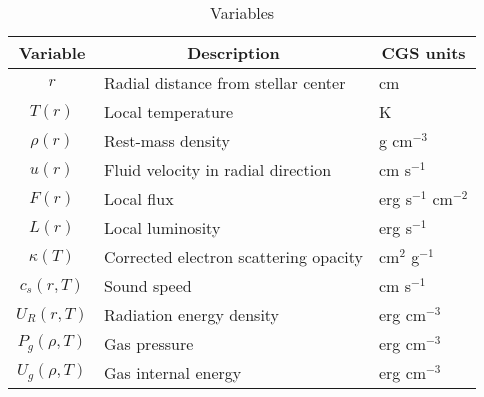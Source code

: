 \documentclass[../main.tex]{subfiles}
\begin{document}
\begin{table}[htb!]
    \centering
    \caption{Variables}
    \begin{tabular}{cll}
        \hline
        Variable & \multicolumn{1}{c}{Description} & \multicolumn{1}{c}{CGS units}  \\\hline
        $r$ & Radial distance from stellar center & cm\\
        $T(r)$ & Local temperature & K\\
        $\rho(r)$ & Rest-mass density & g cm$^{-3}$\\
        $u(r)$ & Fluid velocity in radial direction & cm s$^{-1}$\\
        $F(r)$ & Local flux & erg s$^{-1}$ cm$^{-2}$\\
        $L(r)$ & Local luminosity & erg s$^{-1}$\\
        $\kappa(T)$ & Corrected electron scattering opacity & cm$^2$ g$^{-1}$\\
        $c_s(r,T)$ & Sound speed & cm s$^{-1}$\\
        $U_R(r,T)$ & Radiation energy density & erg cm$^{-3}$\\
        $P_g(\rho,T)$ & Gas pressure & erg cm$^{-3}$\\
        $U_g(\rho,T)$ & Gas internal energy & erg cm$^{-3}$\\
    \end{tabular}
\end{table}
\end{document}
